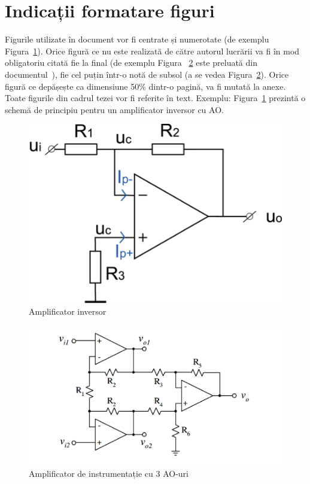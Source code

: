 \documentclass[12pt,a4paper]{report}
\begin{document}
\section{Indicații formatare figuri}

Figurile utilizate în document vor fi centrate și numerotate (de exemplu Figura~\ref{fig:pic1}).
Orice figură ce nu este realizată de către autorul lucrării va fi în mod obligatoriu citată fie la final (de exemplu Figura ~\ref{fig:pic2} este preluată din documentul~\cite{}), fie cel puțin într-o notă de subsol (a se vedea Figura~\ref{fig:pic2}). Orice figură ce depășește ca dimensiune 50\% dintr-o pagină, va fi mutată la anexe. Toate figurile din cadrul tezei vor fi referite în text. Exemplu: Figura~\ref{fig:pic1} prezintă o schemă de principiu pentru un amplificator inversor cu AO.

\begin{figure}[th]
\centering
\includegraphics{pics/Pic1.png}
  \caption{Amplificator inversor}
  \label{fig:pic1}
\end{figure}

\newpage

\begin{figure}[th]
\centering
\includegraphics{pics/Pic2.png}
  \caption[Amplificator de instrumentație cu 3 AO-uri]{Amplificator de instrumentație cu 3 AO-uri\protect\footnotemark}
  \label{fig:pic2}
\end{figure}
\end{document}
